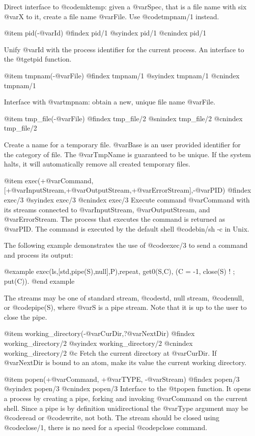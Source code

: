 {{{{{{{{{Direct interface to @code{mktemp}: given a @var{Spec}, that is a file
name with six @var{X} to it, create a file name @var{File}. Use
@code{tmpnam/1} instead.

@item pid(-@var{Id})
@findex  pid/1
@syindex pid/1
@cnindex pid/1

Unify @var{Id} with the process identifier for the current
process. An interface to the @t{getpid} function.

@item tmpnam(-@var{File})
@findex  tmpnam/1
@syindex tmpnam/1
@cnindex tmpnam/1

Interface with @var{tmpnam}: obtain a new, unique file name @var{File}.

@item tmp_file(-@var{File})
@findex  tmp_file/2
@snindex tmp_file/2
@cnindex tmp_file/2

Create a name for a temporary file. @var{Base} is an user provided
identifier for the category of file. The @var{TmpName} is guaranteed to
be unique. If the system halts, it will automatically remove all created
temporary files.


@item exec(+@var{Command},[+@var{InputStream},+@var{OutputStream},+@var{ErrorStream}],-@var{PID})
@findex  exec/3
@syindex exec/3
@cnindex exec/3
Execute command @var{Command} with its streams connected to
@var{InputStream}, @var{OutputStream}, and @var{ErrorStream}. The
process that executes the command is returned as @var{PID}. The
command is executed by the default shell @code{bin/sh -c} in Unix.

The following example demonstrates the use of @code{exec/3} to send a
command and process its output:

@example
exec(ls,[std,pipe(S),null],P),repeat, get0(S,C), (C = -1, close(S) ! ; put(C)).
@end example

The streams may be one of standard stream, @code{std}, null stream,
@code{null}, or @code{pipe(S)}, where @var{S} is a pipe stream. Note
that it is up to the user to close the pipe.

@item working_directory(-@var{CurDir},?@var{NextDir})
@findex  working_directory/2
@syindex working_directory/2
@cnindex working_directory/2    @c 
Fetch the current directory at @var{CurDir}. If @var{NextDir} is bound
to an atom, make its value the current working directory.

@item popen(+@var{Command}, +@var{TYPE}, -@var{Stream})
@findex  popen/3
@syindex popen/3
@cnindex popen/3
Interface to the @t{popen} function. It opens a process by creating a
pipe, forking and invoking @var{Command} on the current shell. Since a
pipe is by definition unidirectional the @var{Type} argument may be
@code{read} or @code{write}, not both. The stream should be closed
using @code{close/1}, there is no need for a special @code{pclose}
command.

}}}}}}}}}
